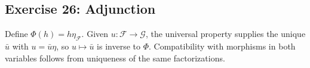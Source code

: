 \subsection*{Exercise 26: Adjunction}
\begin{solution}
Define $\Phi(h)=h\eta_\mathcal F$.  Given $u:\mathcal F\to\mathcal G$, the universal property supplies the unique $\bar u$ with $u=\bar u\eta$, so $u\mapsto\bar u$ is inverse to $\Phi$.  Compatibility with morphisms in both variables follows from uniqueness of the same factorizations.
\end{solution}

